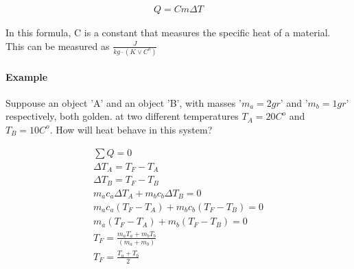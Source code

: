 \documentclass[11pt,fleqn]{book} %
\begin{document}
\begin{gather}
    Q = Cm\Delta T
\end{gather}

In this formula, C is a constant that measures the specific heat of a material. This can be measured as
$\frac{J}{kg \cdot (K\lor C^o)}$

\paragraph*{Example}

Suppouse an object 'A' and an object 'B', with masses '$m_a = 2gr$' and '$m_b = 1 gr$' respectively, both 
golden. at two different temperatures $T_A = 20C^o$ and $T_B = 10C^o$. How will heat behave in this system?

\begin{gather}
    \sum Q = 0\\
    \Delta T_A = T_F - T_A\\
    \Delta T_B = T_F - T_B\\ 
    m_a c_a \Delta T_A + m_b c_b \Delta T_B = 0\\
    m_a c_a (T_F - T_A) + m_b c_b (T_F - T_B) = 0\\
    m_a (T_F - T_A) + m_b (T_F - T_B) = 0\\ 
    T_F = \frac{m_a T_a + m_b T_b}{(m_a + m_b)}\\
    T_F = \frac{T_a + T_b}{2}
\end{gather}


\printbibliography
\end{document}
